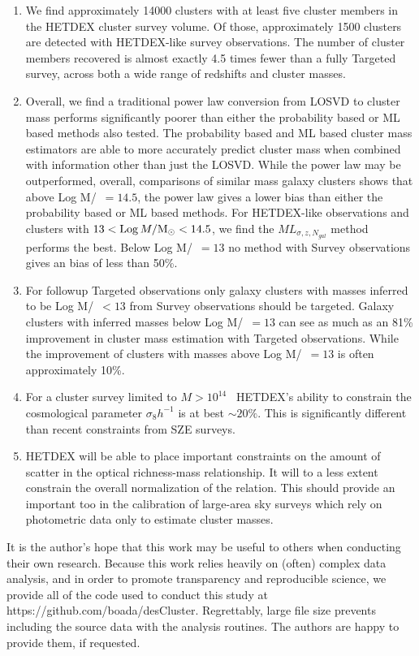 \documentclass[fleqn,usenatbib]{mnras}
\begin{document}
\begin{enumerate}
	\item We find approximately 14000 clusters with at least five cluster members in the HETDEX cluster survey volume. Of those, approximately 1500 clusters are detected with HETDEX-like survey observations. The number of cluster members recovered is almost exactly 4.5 times fewer than a fully Targeted survey, across both a wide range of redshifts and cluster masses.
	\item Overall, we find a traditional power law conversion from LOSVD to cluster mass performs significantly poorer than either the probability based or ML based methods also tested. The probability based and ML based cluster mass estimators are able to more accurately predict cluster mass when combined with information other than just the LOSVD. While the power law may be outperformed, overall, comparisons of similar mass galaxy clusters shows that above Log M/\Msol\ $=14.5$, the power law gives a lower bias than either the probability based or ML based methods. For HETDEX-like observations and clusters with $13 < \mathrm{Log}\, M/\hbox{$\mathrm{M}_\odot$} <14.5$, we find the $ML_{\sigma, z, N_{gal}}$ method performs the best. Below Log M/\Msol\ $=13$ no method with Survey observations gives an bias of less than 50\%.
	\item For followup Targeted observations only galaxy clusters with masses inferred to be Log M/\Msol\ $<13$ from Survey observations should be targeted. Galaxy clusters with inferred masses below Log M/\Msol\ $=13$ can see as much as an 81\% improvement in cluster mass estimation with Targeted observations. While the improvement of clusters with masses above Log M/\Msol\ $=13$ is often approximately 10\%.
	\item For a cluster survey limited to $M > 10^{14}$ \Msol\, HETDEX's ability to constrain the cosmological parameter $\sigma_8 h^{-1}$ is at best $\sim20\%$. This is significantly different than recent constraints from SZE surveys.
	\item HETDEX will be able to place important constraints on the amount of scatter in the optical richness-mass relationship. It will to a less extent constrain the overall normalization of the relation. This should provide an important too in the calibration of large-area sky surveys which rely on photometric data only to estimate cluster masses.
\end{enumerate}

It is the author's hope that this work may be useful to others when conducting their own research. Because this work relies heavily on (often) complex data analysis, and in order to promote transparency and reproducible science, we provide all of the code used to conduct this study at https://github.com/boada/desCluster. Regrettably, large file size prevents including the source data with the analysis routines. The authors are happy to provide them, if requested.
\end{document}
